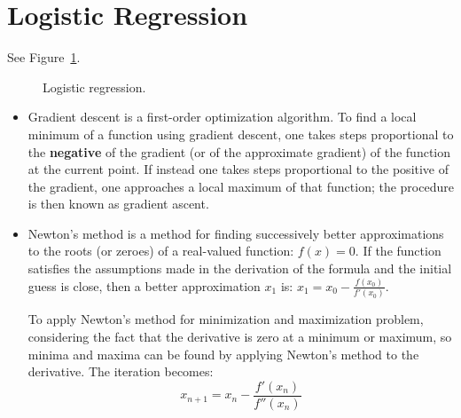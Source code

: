 \section{Logistic Regression}
 See Figure~\ref{fig:logistic}.
\begin{figure}[t]
	\caption{Logistic regression.}
	\label{fig:logistic}
\end{figure}

\begin{itemize}
\item {} Gradient descent is a first-order optimization algorithm. To find a local minimum of a function using gradient descent, one takes steps proportional to the \textbf{negative} of the gradient (or of the approximate gradient) of the function at the current point. If instead one takes steps proportional to the positive of the gradient, one approaches a local maximum of that function; the procedure is then known as gradient ascent.

\item {} Newton's method is a method for finding successively better approximations to the roots (or zeroes) of a real-valued function: $f(x) = 0$. If the function satisfies the assumptions made in the derivation of the formula and the initial guess is close, then a better approximation $x_1$ is: $x_1 = x_0 - \frac{f(x_0)}{f'(x_0)}$.

To apply Newton's method for minimization and maximization problem, considering the fact that the derivative is zero at a minimum or maximum, so minima and maxima can be found by applying Newton's method to the derivative. The iteration becomes:
\[
x_{n+1} = x_n - \frac{f'(x_n)}{f''(x_n)}
\]
\end{itemize}


